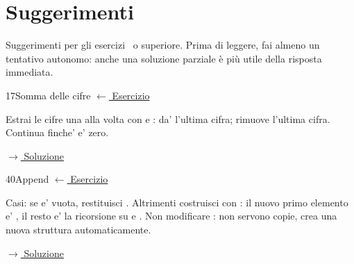 ﻿%
\chapter*{Suggerimenti}
\setcounter{hintsec}{0}  %

\noindent\small\color{black!65}
Suggerimenti per gli esercizi \treStelle\ o superiore.
Prima di leggere, fai almeno un tentativo autonomo: anche una soluzione parziale è più utile della risposta immediata.
\color{black}

\vspace{8pt}


\label{hint:17}
\begin{hintbox}{17}{Somma delle cifre}
\small\color{black!55}\hyperref[ex:17]{$\leftarrow$ Esercizio}\normalsize\color{black}

Estrai le cifre una alla volta con  e :
 da' l'ultima cifra;  rimuove
l'ultima cifra. Continua finche'  e' zero.

\small\color{black!55}\hyperref[sol:17]{$\rightarrow$ Soluzione}\normalsize\color{black}
\end{hintbox}


\label{hint:40}
\begin{hintbox}{40}{Append}
\small\color{black!55}\hyperref[ex:40]{$\leftarrow$ Esercizio}\normalsize\color{black}

Casi: se  e' vuota, restituisci .
Altrimenti costruisci con : il nuovo primo elemento
e' , il resto e' la ricorsione su 
e .
Non modificare : non servono copie,  crea
una nuova struttura automaticamente.

\small\color{black!55}\hyperref[sol:40]{$\rightarrow$ Soluzione}\normalsize\color{black}
\end{hintbox}

